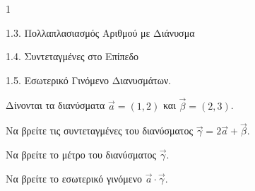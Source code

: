 \begin{ylh}{1}
    \item 1.3. Πολλαπλασιασμός Αριθμού με Διάνυσμα
    \item 1.4. Συντεταγμένες στο Επίπεδο
    \item 1.5. Εσωτερικό Γινόμενο Διανυσμάτων.
\end{ylh}
Δίνονται τα διανύσματα $\vec{a} = (1,2)$ και $\vec{\beta} = (2,3)$.
\begin{alist}
\item Να βρείτε τις συντεταγμένες του διανύσματος $\vec{\gamma} = 2\vec{a} + \vec{\beta}$. 
\item Να βρείτε το μέτρο του διανύσματος $\vec{\gamma}$. 
\item Να βρείτε το εσωτερικό γινόμενο $\vec{a} \cdot \vec{\gamma}$. 
\end{alist}